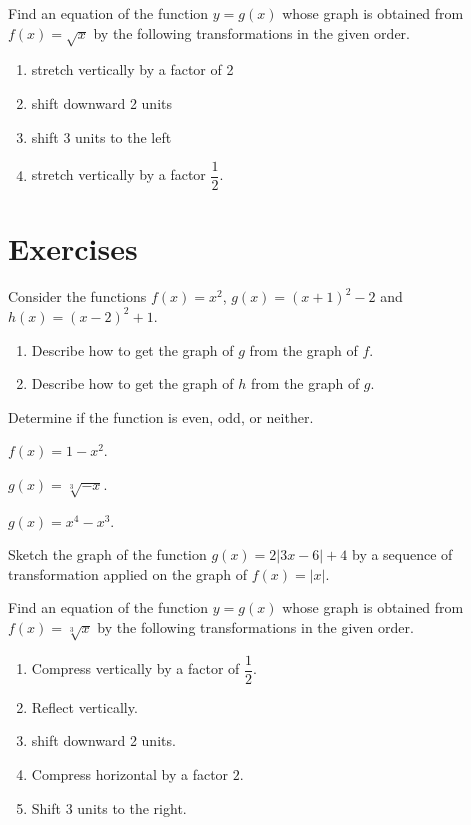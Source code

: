 \begin{example}
  Find an equation of the function $y=g(x)$ whose graph is obtained from $f(x)=\sqrt{x}$ by the following transformations in the given order.
  \begin{enumerate}
    \item stretch vertically by a factor of 2
    \item shift downward 2 units
    \item shift 3 units to the left
    \item stretch vertically by a factor $\dfrac{1}{2}$.
  \end{enumerate}
\end{example}

\newpage

\section*{Exercises}

\begin{exercise}
    Consider the functions $f(x)=x^2$, $g(x)=(x+1)^2-2$ and $h(x)=(x-2)^2+1$.
    \begin{enumerate}
      \item Describe how to get the graph of $g$ from the graph of $f$.
      \item Describe how to get the graph of $h$ from the graph of $g$.
    \end{enumerate}
\end{exercise}

\begin{exercise}
    Determine if the function is even, odd, or neither.\\
    \begin{enumerate*}
      \item $f(x)=1-x^2$.
      \item $g(x)=\sqrt[3]{-x}$.
      \item $g(x)=x^4-x^3$.
      \hfill\mbox{}
    \end{enumerate*}  
\end{exercise}

\newpage

\begin{exercise}
  Sketch the graph of the function $g(x)=2|3x-6| + 4$ by a sequence of transformation applied on the graph of $f(x)=|x|$.  
\end{exercise}

\begin{exercise}
  Find an equation of the function $y=g(x)$ whose graph is obtained from $f(x)=\sqrt[3]{x}$ by the following transformations in the given order.
  \begin{enumerate}
    \item Compress vertically by a factor of $\dfrac{1}{2}$.
    \item Reflect vertically.
    \item shift downward 2 units.
    \item Compress horizontal by a factor $2$.
    \item Shift 3 units to the right.
  \end{enumerate}
\end{exercise}

